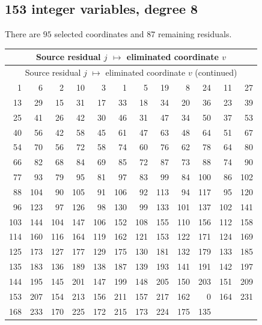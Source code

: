 \documentclass[11pt,letterpaper]{article}
\theoremstyle{definition}
\theoremstyle{remark}
\begin{document}
\subsection{153 integer variables, degree 8}
There are $95$ selected coordinates and $87$ remaining residuals.
\begingroup
\small
\setlength{\tabcolsep}{4pt}
\begin{longtable}{*{6}{r@{\,$\mapsto$\,}r}}
\hline
\multicolumn{12}{c}{Source residual $j$ $\mapsto$ eliminated coordinate $v$}\\
\hline
\endfirsthead
\hline
\multicolumn{12}{c}{Source residual $j$ $\mapsto$ eliminated coordinate $v$ (continued)}\\
\hline
\endhead
1 & 6 & 2 & 10 & 3 & 1 & 5 & 19 & 8 & 24 & 11 & 27 \\
13 & 29 & 15 & 31 & 17 & 33 & 18 & 34 & 20 & 36 & 23 & 39 \\
25 & 41 & 26 & 42 & 30 & 46 & 31 & 47 & 34 & 50 & 37 & 53 \\
40 & 56 & 42 & 58 & 45 & 61 & 47 & 63 & 48 & 64 & 51 & 67 \\
54 & 70 & 56 & 72 & 58 & 74 & 60 & 76 & 62 & 78 & 64 & 80 \\
66 & 82 & 68 & 84 & 69 & 85 & 72 & 87 & 73 & 88 & 74 & 90 \\
77 & 93 & 79 & 95 & 81 & 97 & 83 & 99 & 84 & 100 & 86 & 102 \\
88 & 104 & 90 & 105 & 91 & 106 & 92 & 113 & 94 & 117 & 95 & 120 \\
96 & 123 & 97 & 126 & 98 & 130 & 99 & 133 & 101 & 137 & 102 & 141 \\
103 & 144 & 104 & 147 & 106 & 152 & 108 & 155 & 110 & 156 & 112 & 158 \\
114 & 160 & 116 & 164 & 119 & 162 & 121 & 153 & 122 & 171 & 124 & 169 \\
125 & 173 & 127 & 177 & 129 & 175 & 130 & 181 & 132 & 179 & 133 & 185 \\
135 & 183 & 136 & 189 & 138 & 187 & 139 & 193 & 141 & 191 & 142 & 197 \\
144 & 195 & 145 & 201 & 147 & 199 & 148 & 205 & 150 & 203 & 151 & 209 \\
153 & 207 & 154 & 213 & 156 & 211 & 157 & 217 & 162 & 0 & 164 & 231 \\
168 & 233 & 170 & 225 & 172 & 215 & 173 & 224 & 175 & 135 & \multicolumn{2}{c}{} \\
\hline
\end{longtable}
\endgroup
\end{document}
